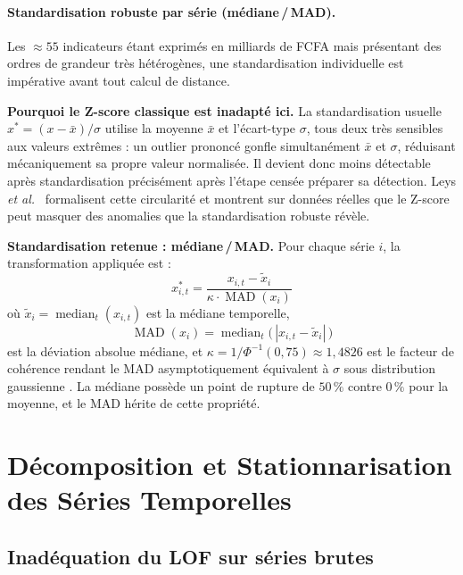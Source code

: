 \documentclass[12pt, a4paper]{article}
\begin{document}
\paragraph{Standardisation robuste par série (médiane\,/\,MAD).}

Les $\approx 55$ indicateurs étant exprimés en milliards de FCFA mais
présentant des ordres de grandeur très hétérogènes, une standardisation
individuelle est impérative avant tout calcul de distance.

\textbf{Pourquoi le Z-score classique est inadapté ici.}
La standardisation usuelle $x^* = (x - \bar{x}) / \sigma$ utilise la moyenne
$\bar{x}$ et l'écart-type $\sigma$, tous deux très sensibles aux valeurs
extrêmes : un outlier prononcé gonfle simultanément $\bar{x}$ et $\sigma$,
réduisant mécaniquement sa propre valeur normalisée. Il devient donc moins
détectable après standardisation  précisément après l'étape censée préparer
sa détection. Leys \textit{et al.}~\cite{leys2013mad} formalisent cette
circularité et montrent sur données réelles que le Z-score peut masquer des
anomalies que la standardisation robuste révèle.

\textbf{Standardisation retenue : médiane\,/\,MAD.}
Pour chaque série $i$, la transformation appliquée est :
\[
    x_{i,t}^* = \frac{x_{i,t} - \tilde{x}_i}
                     {\kappa \cdot \operatorname{MAD}(x_i)}
\]
où $\tilde{x}_i = \operatorname{median}_t(x_{i,t})$ est la médiane
temporelle,
\[
    \operatorname{MAD}(x_i) =
    \operatorname{median}_t\!\bigl(\,|x_{i,t} - \tilde{x}_i|\,\bigr)
\]
est la déviation absolue médiane, et
$\kappa = 1/\Phi^{-1}(0{,}75) \approx 1{,}4826$ est le facteur de cohérence
rendant le MAD asymptotiquement équivalent à $\sigma$ sous distribution
gaussienne \cite{leys2013mad}. La médiane possède un point de rupture de
$50\,\%$ contre $0\,\%$ pour la moyenne, et le MAD hérite de cette propriété.

\section{Décomposition et Stationnarisation des Séries Temporelles}
\label{sec:decomposition}

\subsection{Inadéquation du LOF sur séries brutes}
\label{subsec:inadequation_lof}
\end{document}
